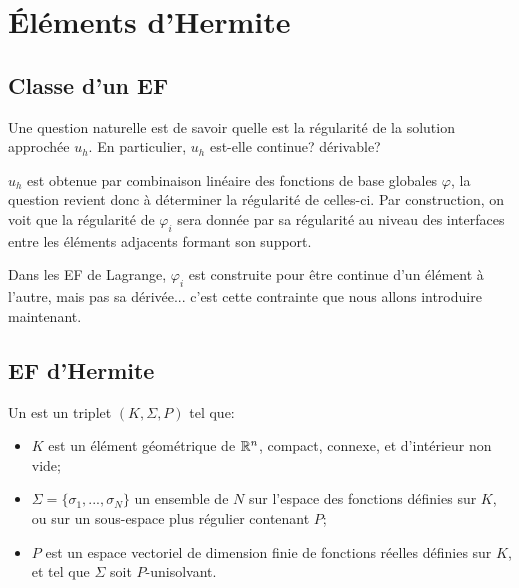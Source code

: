\medskip
\section{Éléments d'Hermite}

\medskip
\subsection{Classe d'un EF}

Une question naturelle est de savoir quelle est la régularité de la solution approchée 
$u_h$. En particulier, $u_h$ est-elle continue? dérivable?

$u_h$ est obtenue par combinaison linéaire des fonctions de base globales 
$\varphi$, la question revient donc à déterminer la régularité de celles-ci.
Par construction, on voit que la régularité de $\varphi_i$ sera donnée par sa 
régularité au niveau des interfaces entre les éléments adjacents formant
son support.

Dans les EF de Lagrange, $\varphi_i$ est construite pour être continue
d'un élément à l'autre, mais pas sa dérivée... c'est cette contrainte que
nous allons introduire maintenant.

\medskip
\subsection{EF d'Hermite}

\begin{definition}[EF d'Hermite]
Un  est un 
triplet $(K, \Sigma, P)$ tel que:
\begin{itemize}
   \item $K$ est un élément géométrique de $\mathbb R^n$, compact, connexe, et d'intérieur
	non vide;
   \item $\Sigma=\{\sigma_1, ..., \sigma_N\}$ un ensemble de $N$ 
	sur l'espace des fonctions définies sur $K$, ou sur un sous-espace plus régulier contenant $P$;
   \item $P$ est un espace vectoriel de dimension finie de fonctions réelles définies sur $K$, et tel
	que $\Sigma$ soit $P$-unisolvant.
\end{itemize}
\end{definition}

